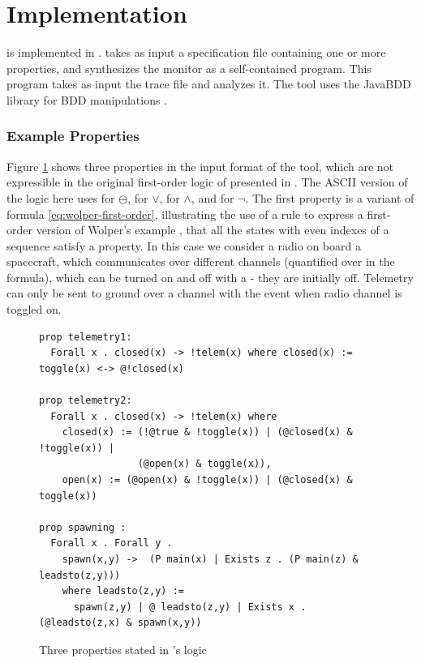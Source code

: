 
\section{Implementation}

\dejavu{} is implemented in \scalalang{}.   
\dejavu{} takes as input a specification file containing one  or 
more  properties, and synthesizes the monitor as a self-contained \scalalang{} 
program.
This program takes as input the 
trace file and analyzes it.
The tool uses the JavaBDD library for BDD manipulations \cite{javabdd}.

\subsubsection{Example Properties}

Figure \ref{fig:properties} shows three properties in the 
input format of the tool, which are not expressible in the original first-order logic of \dejavu{} presented in \cite{HPU}. 
%
The ASCII version of the logic here uses 
 for $\ominus$,
\idsl{|} for $\vee$,
\idsl{&} for $\wedge$, and
\idsl{!} for $\neg$.
%
The first property  is a variant of
formula \ref{eq:wolper-first-order}, illustrating the use of a 
rule to express a first-order version of Wolper's example \cite{Wolper}, that all the states with even indexes of a sequence satisfy a property.
In this case we consider a radio on board a spacecraft, which communicates over different channels (quantified over in the formula), which can be turned on and off with a  - they are initially off.
Telemetry can only be sent to ground over a channel  with the  event when radio channel  is toggled on.

\begin{center}
\begin{figure}
\begin{lstlisting}[language=dsl,frame=single,linewidth=0.95\textwidth,backgroundcolor=\color{white},linewidth=\columnwidth,breaklines=true,basicstyle=\small]
prop telemetry1: 
  Forall x . closed(x) -> !telem(x) where closed(x) := toggle(x) <-> @!closed(x)

prop telemetry2: 
  Forall x . closed(x) -> !telem(x) where
    closed(x) := (!@true & !toggle(x)) | (@closed(x) & !toggle(x)) | 
                 (@open(x) & toggle(x)),
    open(x) := (@open(x) & !toggle(x)) | (@closed(x) & toggle(x))

prop spawning : 
  Forall x . Forall y . 
    spawn(x,y) ->  (P main(x) | Exists z . (P main(z) & leadsto(z,y))) 
    where leadsto(z,y) := 
      spawn(z,y) | @ leadsto(z,y) | Exists x . (@leadsto(z,x) & spawn(x,y))
\end{lstlisting}
\caption{Three properties stated in \dejavu's logic}
\label{fig:properties}
\end{figure}
\end{center}

